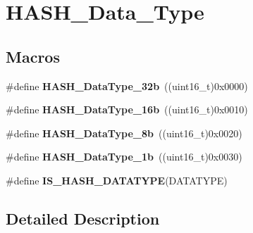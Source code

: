 \hypertarget{group___h_a_s_h___data___type}{\section{H\-A\-S\-H\-\_\-\-Data\-\_\-\-Type}
\label{group___h_a_s_h___data___type}
}
\subsection*{Macros}
\begin{DoxyCompactItemize}
\item 
\hypertarget{group___h_a_s_h___data___type_ga1eb75a90b73558a3ed936aabc518389f}{\#define {\bfseries H\-A\-S\-H\-\_\-\-Data\-Type\-\_\-32b}~((uint16\-\_\-t)0x0000)}\label{group___h_a_s_h___data___type_ga1eb75a90b73558a3ed936aabc518389f}

\item 
\hypertarget{group___h_a_s_h___data___type_ga07a0a06c7076fab096f1cc4ae66bcad8}{\#define {\bfseries H\-A\-S\-H\-\_\-\-Data\-Type\-\_\-16b}~((uint16\-\_\-t)0x0010)}\label{group___h_a_s_h___data___type_ga07a0a06c7076fab096f1cc4ae66bcad8}

\item 
\hypertarget{group___h_a_s_h___data___type_ga82d37dec3af7193f8e665615108011a9}{\#define {\bfseries H\-A\-S\-H\-\_\-\-Data\-Type\-\_\-8b}~((uint16\-\_\-t)0x0020)}\label{group___h_a_s_h___data___type_ga82d37dec3af7193f8e665615108011a9}

\item 
\hypertarget{group___h_a_s_h___data___type_ga52034893dfa756397af1d681960be92f}{\#define {\bfseries H\-A\-S\-H\-\_\-\-Data\-Type\-\_\-1b}~((uint16\-\_\-t)0x0030)}\label{group___h_a_s_h___data___type_ga52034893dfa756397af1d681960be92f}

\item 
\#define {\bfseries I\-S\-\_\-\-H\-A\-S\-H\-\_\-\-D\-A\-T\-A\-T\-Y\-P\-E}(D\-A\-T\-A\-T\-Y\-P\-E)
\end{DoxyCompactItemize}


\subsection{Detailed Description}


